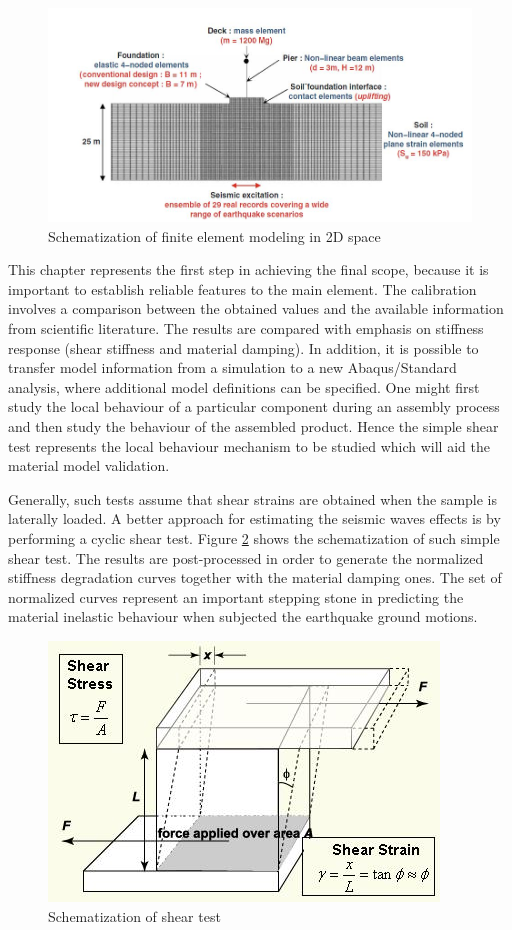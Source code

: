 \documentclass[12pt,a4paper]{report}
\begin{document}
\begin{figure}[h!]
	\centering
	\includegraphics[width=0.8\linewidth]{"scheme2D"}
	\caption{Schematization of finite element modeling in 2D space}
	\label{FEM2d}
\end{figure}

This chapter represents the first step in achieving the final scope, because it is important to establish reliable features to the main element. The calibration involves a comparison between the obtained values and the available information from scientific literature. The results are compared with emphasis on stiffness response (shear stiffness and material damping). In addition, it is possible to transfer model information from a simulation to a new Abaqus/Standard analysis, where additional model definitions can be specified. One might first study the local behaviour of a particular component during an assembly process and then study the behaviour of the assembled product. Hence the simple shear test represents the local behaviour mechanism to be studied which will aid the material model validation. 

Generally, such tests assume that shear strains are obtained when the sample is laterally loaded. A better approach for estimating the seismic waves effects is by performing a cyclic shear test. Figure \ref{fig:shear} shows the schematization of such simple shear test. The results are post-processed in order to generate the normalized stiffness degradation curves together with the material damping ones. The set of normalized curves represent an important stepping stone in predicting the material inelastic behaviour when subjected the earthquake ground motions. 

\begin{figure}[h!]
	\centering
	\includegraphics[width=0.6\linewidth]{"shear_strain_detail"}
	\caption{Schematization of shear test}
	\label{fig:shear}
\end{figure}
\end{document}
